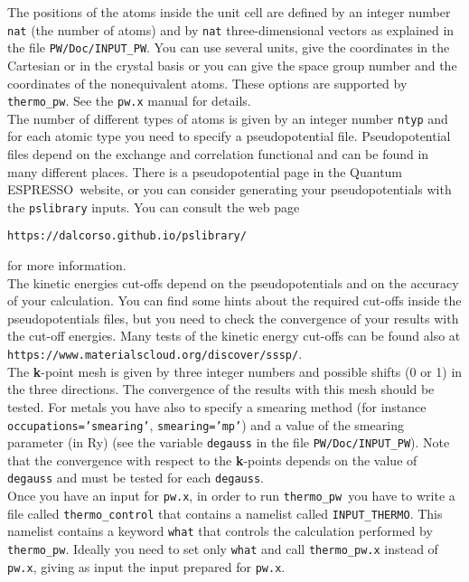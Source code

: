 \documentclass[12pt,a4paper]{article}
\def\qe{{\sc Quantum ESPRESSO}}
\def\thermo{\texttt{thermo\_pw}}
\begin{document}
The positions of the atoms inside the unit cell are defined by an integer
number \texttt{nat} (the number of atoms) and by \texttt{nat} 
three-dimensional vectors as explained in the file \texttt{PW/Doc/INPUT\_PW}.
You can use several units, give the coordinates in the Cartesian or in the
crystal basis or you can give the space group number and the
coordinates of the nonequivalent atoms. 
These options are supported by \thermo. See the \texttt{pw.x} manual
for details. \\

The number of different types of atoms is given by an integer number 
\texttt{ntyp} and for each atomic type you need to specify a 
pseudopotential file. Pseudopotential files depend on the exchange and 
correlation functional and can be found in many 
different places. There is a pseudopotential page in the \qe\ website, or 
you can consider generating your pseudopotentials with the \texttt{pslibrary} 
inputs. You can consult the web page 
\begin{center}
\texttt{https://dalcorso.github.io/pslibrary/} 
\end{center}
for more information. \\

The kinetic energies cut-offs depend on the pseudopotentials
and on the accuracy of your calculation. You can 
find some hints about the required cut-offs inside the pseudopotentials files,
but you need to check the convergence of your results with the cut-off 
energies. Many tests of the kinetic energy cut-offs can be found also at 
\texttt{https://www.materialscloud.org/discover/sssp/}. \\

The {\bf k}-point mesh is given by three integer numbers and possible
shifts (0 or 1) in the three directions. The convergence of the results
with this mesh should be tested. For metals you have also to specify a
smearing method (for instance \texttt{occupations='smearing'}, 
\texttt{smearing='mp'}) and a value of the smearing parameter (in Ry) 
(see the variable \texttt{degauss} in the file \texttt{PW/Doc/INPUT\_PW}). 
Note that the convergence with respect to the {\bf k}-points depends on
the value of \texttt{degauss} and must be tested for each \texttt{degauss}. \\

Once you have an input for \texttt{pw.x}, in order to run \thermo\ you
have to write a file called \texttt{thermo\_control} that contains a
namelist called \texttt{INPUT\_THERMO}. This namelist contains a keyword
\texttt{what} that controls the calculation performed by 
\thermo. Ideally you need to set only \texttt{what} and call 
\texttt{thermo\_pw.x} instead of \texttt{pw.x}, giving as input the 
input prepared for \texttt{pw.x}.
\end{document}
